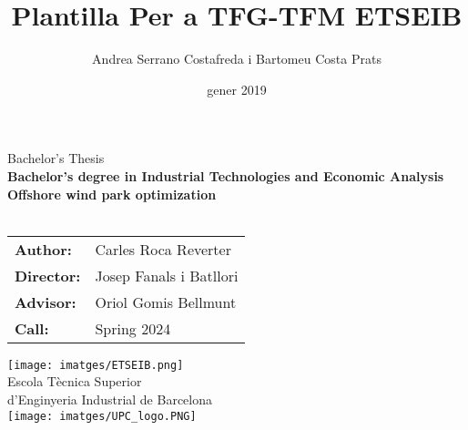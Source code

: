 \documentclass[a4paper,11pt, titlepage, twoside]{article}
\title{Plantilla Per a TFG-TFM ETSEIB}
\author{Andrea Serrano Costafreda i Bartomeu Costa Prats }
\date{gener 2019}
\begin{document}
\renewcommand{\refname}{Bibliografia}
\begin{titlepage}
    {\centering
    {\Huge Bachelor's Thesis}\\
    \vspace{5mm}
    {\Large \textbf{Bachelor's degree in Industrial Technologies and Economic Analysis}}\\
    \vspace{20mm}
    \Huge \textbf{Offshore wind park optimization}\\
    \vspace{10mm}
    \vspace{3mm}
    \Large{}\\  %
    }
    \vspace{20mm}
    \hspace{2mm}
    \begin{tabular}{l@{ } l}
        \vspace{5mm}
        \Large \textbf{Author:} & \Large{Carles Roca Reverter} \\
        \vspace{5mm}
        \Large\textbf{Director:} & \Large{Josep Fanals i Batllori}\\
        \vspace{5mm}
        \Large\textbf{Advisor:} & \Large{Oriol Gomis Bellmunt}\\
        
         \Large\textbf{Call: } & \Large{Spring 2024}\\
    \end{tabular}\par
    \vspace{10mm}
    {\centering
    \texttt{[image: imatges/ETSEIB.png]}\\
    {\Large Escola Tècnica Superior \\ d'Enginyeria Industrial de Barcelona}\\
    \vspace{3mm}
    \texttt{[image: imatges/UPC\_logo.PNG]}
    \par
    }
    \end{titlepage}

\clearpage
\thispagestyle{empty}
\null\newpage 
{}
\end{document}
